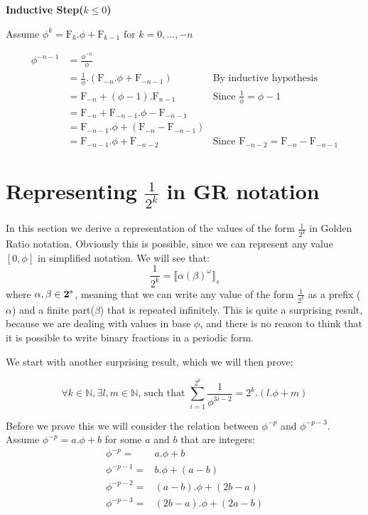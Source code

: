 \documentclass{cs4rep}
\begin{document}
{\bf Inductive Step($k \leq 0$)}

Assume $\phi^{k} = \mbox{F}_{k}.\phi + \mbox{F}_{k-1} \mbox{ for }
k=0,\ldots ,-n $

\[ \begin{array}{lll}
\phi^{-n-1} & = \frac{\phi^{-n}}{\phi} \\
& = \frac{1}{\phi}.(\mbox{F}_{-n}.\phi + \mbox{F}_{-n-1}) & \mbox{By inductive hypothesis} \\
& = \mbox{F}_{-n} + (\phi-1).\mbox{F}_{n-1} & \mbox{Since } \frac{1}{\phi} = \phi-1 \\
& = \mbox{F}_{-n} + \mbox{F}_{-n-1}.\phi - \mbox{F}_{-n-1}\\
& = \mbox{F}_{-n-1}.\phi + (\mbox{F}_{-n} - \mbox{F}_{-n-1}) \\
& = \mbox{F}_{-n-1}.\phi + \mbox{F}_{-n-2} & \mbox{Since } \mbox{F}_{-n-2}= \mbox{F}_{-n} - \mbox{F}_{-n-1}
\end{array} \]

\section{Representing $\frac{1}{2^{k}}$ in GR notation}
In this section we derive a representation of the values of the form
$\frac{1}{2^{k}}$ in Golden Ratio notation. Obviously this is
possible, since we can represent any value $[0,\phi]$ in simplified
notation. We will see that:
\[ \frac{1}{2^{k}} = \llbracket \alpha(\beta)^{\omega} \rrbracket_{s} \]
where $\alpha, \beta \in {\bf 2}^{*}$, meaning that we can write any
value of the form $\frac{1}{2^{k}}$ as a prefix ($\alpha$) and a
finite part($\beta$) that is repeated infinitely. This is quite a
surprising result, because we are dealing with values in base $\phi$,
and there is no reason to think that it is possible to write binary
fractions in a periodic form.

We start with another surprising result, which we will then prove:
\begin{myprop} \label{eq:2kbasic}
\[ \forall k \in \mathbb{N}, \exists l,m \in \mathbb{N} \mbox{, such that }\sum_{i=1}^{2^{k}} \frac{1}{\phi^{3i-2}} = 2^{k}.(l.\phi+m) \]
\end{myprop}

Before we prove this we will consider the relation between $\phi^{-p}$
and $\phi^{-p-3}$. Assume $\phi^{-p} = a.\phi+b$ for some $a$ and $b$
that are integers:
\[ \begin{array}{rl}
\phi^{-p} = & a.\phi+b \\
\phi^{-p-1} = & b.\phi+(a-b) \\
\phi^{-p-2} = & (a-b).\phi+(2b-a) \\
\phi^{-p-3} = & (2b-a).\phi+(2a-b)
\end{array} \]
\end{document}
